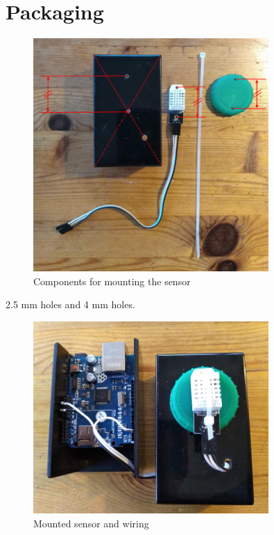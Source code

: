 \documentclass[a4paper, 12pt]{article}
\begin{document}
\section{Packaging}

\begin{figure}[H]
  \centering
  \includegraphics[width=0.8\textwidth]{sensor-mount.jpg}
  \caption{Components for mounting the sensor}
\end{figure}

2.5 mm holes and 4 mm holes.

\begin{figure}[H]
  \centering
  \includegraphics[width=0.8\textwidth]{packaging.jpg}
  \caption{Mounted sensor and wiring}
\end{figure}
\end{document}
